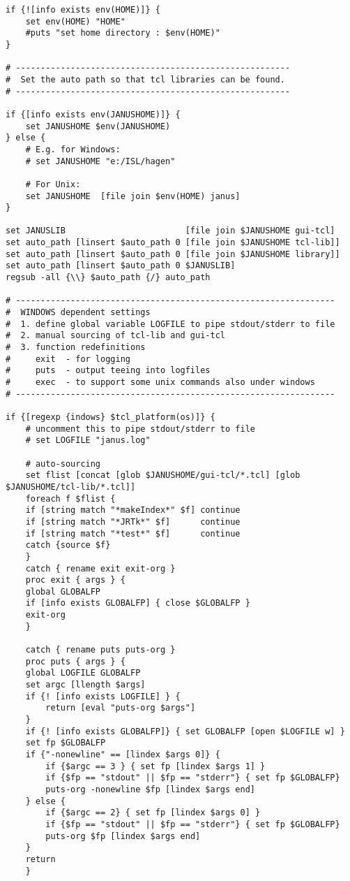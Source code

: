 {\begin{verbatim}
if {![info exists env(HOME)]} {
    set env(HOME) "HOME"
    #puts "set home directory : $env(HOME)"
} 

# -------------------------------------------------------
#  Set the auto path so that tcl libraries can be found.
# -------------------------------------------------------

if {[info exists env(JANUSHOME)]} { 
    set JANUSHOME $env(JANUSHOME)
} else {
    # E.g. for Windows:
    # set JANUSHOME "e:/ISL/hagen"

    # For Unix:
    set JANUSHOME  [file join $env(HOME) janus]
}

set JANUSLIB                        [file join $JANUSHOME gui-tcl]
set auto_path [linsert $auto_path 0 [file join $JANUSHOME tcl-lib]]
set auto_path [linsert $auto_path 0 [file join $JANUSHOME library]]
set auto_path [linsert $auto_path 0 $JANUSLIB]
regsub -all {\\} $auto_path {/} auto_path

# ----------------------------------------------------------------
#  WINDOWS dependent settings
#  1. define global variable LOGFILE to pipe stdout/stderr to file
#  2. manual sourcing of tcl-lib and gui-tcl
#  3. function redefinitions
#     exit  - for logging
#     puts  - output teeing into logfiles
#     exec  - to support some unix commands also under windows
# ----------------------------------------------------------------

if {[regexp {indows} $tcl_platform(os)]} {
    # uncomment this to pipe stdout/stderr to file
    # set LOGFILE "janus.log"

    # auto-sourcing
    set flist [concat [glob $JANUSHOME/gui-tcl/*.tcl] [glob $JANUSHOME/tcl-lib/*.tcl]]
    foreach f $flist { 
	if [string match "*makeIndex*" $f] continue
	if [string match "*JRTk*" $f]      continue
	if [string match "*test*" $f]      continue
	catch {source $f}
    }
    catch { rename exit exit-org }
    proc exit { args } {
	global GLOBALFP
	if [info exists GLOBALFP] { close $GLOBALFP }
	exit-org
    }

    catch { rename puts puts-org }
    proc puts { args } {
	global LOGFILE GLOBALFP
	set argc [llength $args]
	if {! [info exists LOGFILE] } { 
	    return [eval "puts-org $args"]
	}
	if {! [info exists GLOBALFP]} { set GLOBALFP [open $LOGFILE w] }
	set fp $GLOBALFP
	if {"-nonewline" == [lindex $args 0]} {
	    if {$argc == 3 } { set fp [lindex $args 1] }
	    if {$fp == "stdout" || $fp == "stderr"} { set fp $GLOBALFP}
	    puts-org -nonewline $fp [lindex $args end]
	} else {
	    if {$argc == 2} { set fp [lindex $args 0] }
	    if {$fp == "stdout" || $fp == "stderr"} { set fp $GLOBALFP}
	    puts-org $fp [lindex $args end]
	}
	return
    }


\end{verbatim}}
